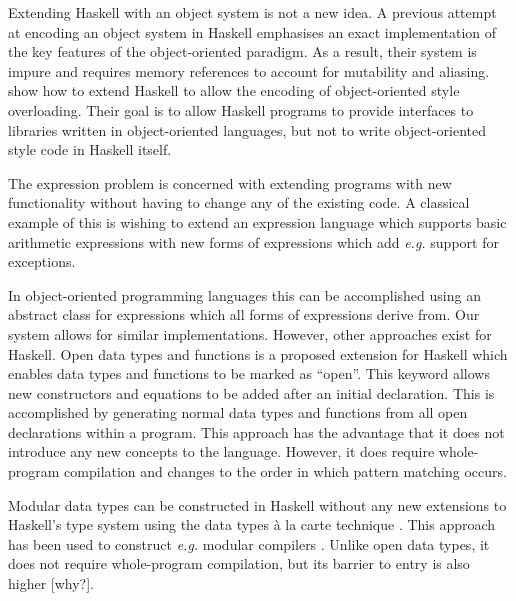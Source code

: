 \documentclass[runningheads,a4paper]{llncs}
\newcommand{\todo}[1]{[{\color{blue}#1}]}
\begin{document}


Extending Haskell with an object system is not a new idea. A previous attempt at encoding an object system in Haskell \cite{OOHaskell} emphasises an exact implementation of the key features of the object-oriented paradigm. As a result, their system is impure and requires memory references to account for mutability and aliasing. \cite{shields2001object} show how to extend Haskell to allow the encoding of object-oriented style overloading. Their goal is to allow Haskell programs to provide interfaces to libraries written in object-oriented languages, but not to write object-oriented style code in Haskell itself.


The expression problem \cite{wadler1998expression} is concerned with extending programs with new functionality without having to change any of the existing code. A classical example of this is wishing to extend an expression language which supports basic arithmetic expressions with new forms of expressions which add \emph{e.g.} support for exceptions.  

In object-oriented programming languages this can be accomplished using an abstract class for expressions which all forms of expressions derive from. Our system allows for similar implementations. However, other approaches exist for Haskell. Open data types and functions \cite{loh2006open} is a proposed extension for Haskell which enables data types and functions to be marked as ``open''. This keyword allows new constructors and equations to be added after an initial declaration. This is accomplished by generating normal data types and functions from all open declarations within a program. This approach has the advantage that it does not introduce any new concepts to the language. However, it does require whole-program compilation and changes to the order in which pattern matching occurs.

Modular data types can be constructed in Haskell without any new extensions to Haskell's type system using the data types \`a la carte technique \cite{swierstra2008data}. This approach has been used to construct \emph{e.g.} modular compilers \cite{day2012towards}. Unlike open data types, it does not require whole-program compilation, but its barrier to entry is also higher \todo{why?}. 
\end{document}
